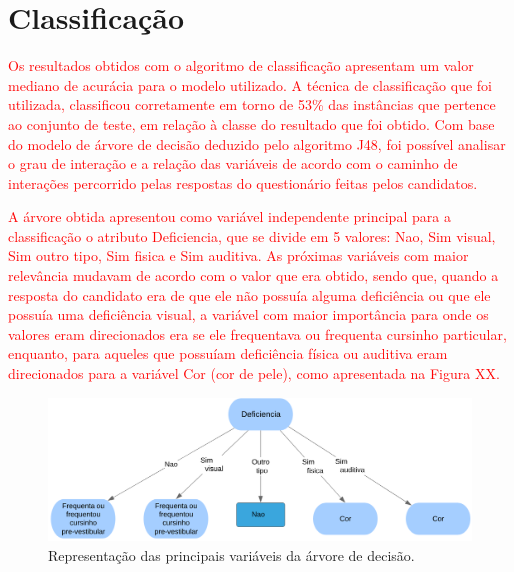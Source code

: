\label{chapter:Resultados}

\section{Classificação}

\par
\textcolor{red}{Os resultados obtidos com o algoritmo de classificação apresentam um valor mediano de acurácia para o modelo utilizado. A técnica de classificação que foi utilizada, classificou corretamente em torno de 53\% das instâncias que pertence ao conjunto de teste, em relação à classe do resultado que foi obtido. Com base do modelo de árvore de decisão deduzido pelo algoritmo J48, foi possível analisar o grau de interação e a relação das variáveis de acordo com o caminho de interações percorrido pelas respostas do questionário feitas pelos candidatos.}

\par
\textcolor{red}{A árvore obtida apresentou como variável independente principal para a classificação o atributo Deficiencia, que se divide em 5 valores: Nao, Sim visual, Sim outro tipo, Sim fisica e Sim auditiva. As próximas variáveis com maior relevância mudavam de acordo com o valor que era obtido, sendo que, quando a resposta do candidato era de que ele não possuía alguma deficiência ou que ele possuía uma deficiência visual, a variável com maior importância para onde os valores eram direcionados era se ele frequentava ou frequenta cursinho particular, enquanto, para aqueles que possuíam deficiência física ou auditiva eram direcionados para a variável Cor (cor de pele), como apresentada na Figura XX.}

\par
\begin{figure}[!htp]
	\begin{center}
    \caption{\label{fig:waveform_fig} Representação das principais variáveis da árvore de decisão.}
	\includegraphics[scale=0.57]{Figuras/Arvore_gerada_grau2.png}
	\end{center}
\end{figure}


